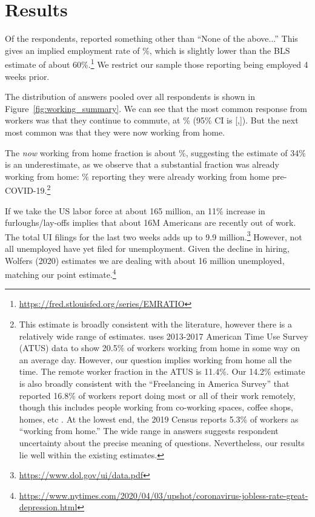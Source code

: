 \documentclass[12pt]{article}
\begin{document}
\section{Results}

Of the respondents, \numObsWorking{} reported something other than ``None of the above...''
This gives an implied employment rate of \LFPRhat{}\%, which is slightly lower than the BLS estimate of about 60\%.\footnote{
  \url{https://fred.stlouisfed.org/series/EMRATIO}
}
We restrict our sample those reporting being employed 4 weeks prior.

The distribution of answers pooled over all respondents is shown in Figure~\ref{fig:working_summary}. 
We can see that the most common response from workers was that they continue to commute, at \stillCommute{}\% (95\% CI is [\stillCommuteLB,\stillCommuteUB]). 
But the next most common was that they were now working from home. 

The \emph{now} working from home fraction is about \WFH{}\%, suggesting the \cite{dingel2020} estimate of 34\% is an underestimate, as we observe that a substantial fraction was already working from home: \alreadyWFH{}\% reporting they were already working from home pre-COVID-19.\footnote{
This estimate is broadly consistent with the literature, however there is a relatively wide range of estimates.
\cite{krantz2019did} uses 2013-2017 American Time Use Survey (ATUS) data to show 20.5\% of workers working from home in some way on an average day.
However, our question implies working from home all the time.
The remote worker fraction in the ATUS is 11.4\%.
Our 14.2\% estimate is also broadly consistent with the ``Freelancing in America Survey'' that reported 16.8\% of workers report doing most or all of their work remotely, though this includes people working from co-working spaces, coffee shops, homes, etc \citep{ozimek2020}.
At the lowest end, the 2019 Census reports 5.3\% of workers as ``working from home.''
The wide range in answers suggests respondent uncertainty about the precise meaning of questions. Nevertheless, our results lie well within the existing estimates.
}

If we take the US labor force at about 165 million, an 11\% increase in furloughs/lay-offs implies that about 16M Americans are recently out of work.
The total UI filings for the last two weeks adds up to 9.9 million.\footnote{
  \url{https://www.dol.gov/ui/data.pdf}
}
However, not all unemployed have yet filed for unemployment.
Given the decline in hiring, Wolfers (2020) estimates we are dealing with about 16 million unemployed, matching our point estimate.\footnote{
  \url{https://www.nytimes.com/2020/04/03/upshot/coronavirus-jobless-rate-great-depression.html}
}
\end{document}
